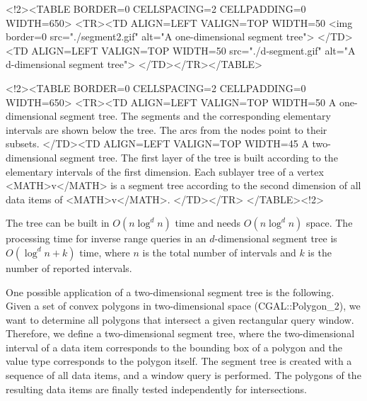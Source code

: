 \begin{ccHtmlOnly}
    <!2><TABLE BORDER=0 CELLSPACING=2 CELLPADDING=0 WIDTH=650>
        <TR><TD ALIGN=LEFT VALIGN=TOP WIDTH=50%
    <img border=0 src="./segment2.gif" alt="A one-dimensional segment
tree">
    </TD>
    <TD ALIGN=LEFT VALIGN=TOP WIDTH=50%
src="./d-segment.gif" alt="A
    d-dimensional segment tree">
      </TD></TR></TABLE>

        <!2><TABLE BORDER=0 CELLSPACING=2 CELLPADDING=0 WIDTH=650>
        <TR><TD ALIGN=LEFT VALIGN=TOP WIDTH=50%
A one-dimensional segment
  tree. The segments and the corresponding elementary intervals
  are shown below the tree. The arcs from the nodes point to
  their subsets.
 </TD><TD ALIGN=LEFT VALIGN=TOP WIDTH=45%
A two-dimensional segment
  tree. The first layer of the tree is built according to the
  elementary intervals of the first dimension. Each
  sublayer tree of a vertex  <MATH>v</MATH> is a segment tree according to
  the  second dimension of all data items of  <MATH>v</MATH>.
 </TD></TR>
        </TABLE><!2>

\end{ccHtmlOnly}
The tree can be built in  $O(n\log^{d} n)$ time and
needs  $O(n\log^{d} n)$ space.
The  processing time for inverse range
queries in an $d$-dimensional segment tree is $O(\log^d n
+k)$ time, where $n$ is the total number of intervals and $k$ is
the number of reported intervals.

One possible application of a two-dimensional segment tree is the
following. Given a set of convex polygons in two-dimensional
space (CGAL::Polygon\_2), we want to determine all polygons
that intersect a given rectangular query window. Therefore, we define a
two-dimensional segment tree, where the two-dimensional interval of
a data item corresponds to the  bounding box of a polygon and the
value type corresponds to the polygon itself. The segment tree is created
with a sequence of all data items, and a window query is
performed. The polygons of the resulting data items are finally
tested independently for intersections.


